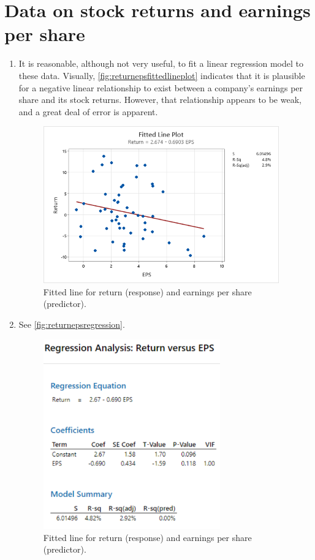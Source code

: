 \documentclass[12pt]{article}
\begin{document}
\section{Data on stock returns and earnings per share}
\begin{enumerate}
\item It is reasonable, although not very useful, to fit a linear regression model to these data. Visually, \autoref{fig:returnepsfittedlineplot} indicates that it is plausible for a negative linear relationship to exist between a company's earnings per share and its stock returns. However, that relationship appears to be weak, and a great deal of error is apparent.
\begin{figure}[h]
\begin{center}
\includegraphics[width=4in]{src/images/return-eps-fitted-line-plot.png}
\end{center}
\caption{Fitted line for return (response) and earnings per share (predictor).\label{fig:returnepsfittedlineplot}}
\end{figure}
\item See \autoref{fig:returnepsregression}.
\begin{figure}
\begin{center}
\includegraphics[width=3in]{src/images/return-eps-regression.png}
\end{center}
\caption{Fitted line for return (response) and earnings per share (predictor).\label{fig:returnepsregression}}
\end{figure}
\end{enumerate}
\end{document}
